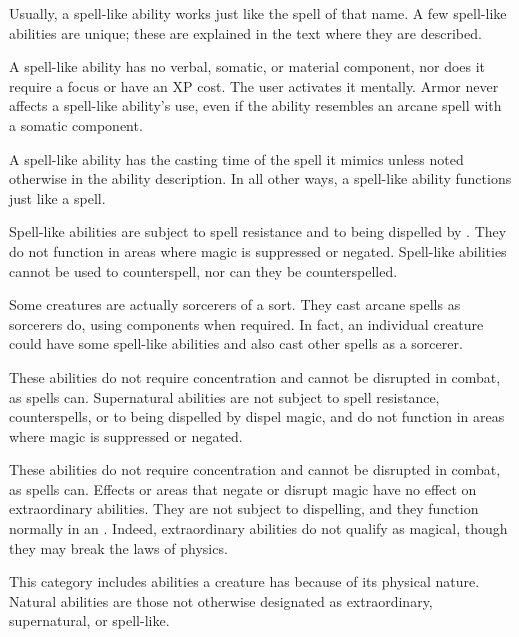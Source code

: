  Usually, a spell-like ability works just like the spell of that name. A few spell-like abilities are unique; these are explained in the text where they are described.

A spell-like ability has no verbal, somatic, or material component, nor does it require a focus or have an XP cost. The user activates it mentally. Armor never affects a spell-like ability's use, even if the ability resembles an arcane spell with a somatic component.

A spell-like ability has the casting time of the spell it mimics unless noted otherwise in the ability description. In all other ways, a spell-like ability functions just like a spell.

Spell-like abilities are subject to spell resistance and to being dispelled by . They do not function in areas where magic is suppressed or negated. Spell-like abilities cannot be used to counterspell, nor can they be counterspelled.

Some creatures are actually sorcerers of a sort. They cast arcane spells as sorcerers do, using components when required. In fact, an individual creature could have some spell-like abilities and also cast other spells as a sorcerer.

 These abilities do not require concentration and cannot be disrupted in combat, as spells can. Supernatural abilities are not subject to spell resistance, counterspells, or to being dispelled by dispel magic, and do not function in areas where magic is suppressed or negated.

 These abilities do not require concentration and cannot be disrupted in combat, as spells can. Effects or areas that negate or disrupt magic have no effect on extraordinary abilities. They are not subject to dispelling, and they function normally in an . Indeed, extraordinary abilities do not qualify as magical, though they may break the laws of physics.

 This category includes abilities a creature has because of its physical nature. Natural abilities are those not otherwise designated as extraordinary, supernatural, or spell-like.

